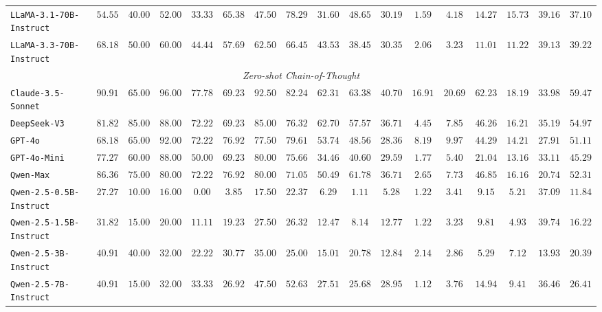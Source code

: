\begin{table*}[]
{\begin{tabular}{lcccccccccccccccc}
\texttt{LLaMA-3.1-70B-Instruct} & $54.55$ & $40.00$ & $52.00$ & $33.33$ & $65.38$ & $47.50$ & $78.29$ & $31.60$ & $48.65$ & $30.19$ & $1.59$ & $4.18$ & $14.27$ & $15.73$ & $39.16$ & $37.10$ \\
\texttt{LLaMA-3.3-70B-Instruct} & $68.18$ & $50.00$ & $60.00$ & $44.44$ & $57.69$ & $62.50$ & $66.45$ & $43.53$ & $38.45$ & $30.35$ & $2.06$ & $3.23$ & $11.01$ & $11.22$ & $39.13$ & $39.22$ \\
\midrule
\multicolumn{17}{c}{\textit{Zero-shot Chain-of-Thought}}                                                                        \\ \midrule
\texttt{Claude-3.5-Sonnet} & $90.91$ & $65.00$ & $96.00$ & $77.78$ & $69.23$ & $92.50$ & $82.24$ & $62.31$ & $63.38$ & $40.70$ & $16.91$ & $20.69$ & $62.23$ & $18.19$ & $33.98$ & $59.47$ \\
\texttt{DeepSeek-V3} & $81.82$ & $85.00$ & $88.00$ & $72.22$ & $69.23$ & $85.00$ & $76.32$ & $62.70$ & $57.57$ & $36.71$ & $4.45$ & $7.85$ & $46.26$ & $16.21$ & $35.19$ & $54.97$ \\
\texttt{GPT-4o} & $68.18$ & $65.00$ & $92.00$ & $72.22$ & $76.92$ & $77.50$ & $79.61$ & $53.74$ & $48.56$ & $28.36$ & $8.19$ & $9.97$ & $44.29$ & $14.21$ & $27.91$ & $51.11$ \\
\texttt{GPT-4o-Mini} & $77.27$ & $60.00$ & $88.00$ & $50.00$ & $69.23$ & $80.00$ & $75.66$ & $34.46$ & $40.60$ & $29.59$ & $1.77$ & $5.40$ & $21.04$ & $13.16$ & $33.11$ & $45.29$ \\
\texttt{Qwen-Max} & $86.36$ & $75.00$ & $80.00$ & $72.22$ & $76.92$ & $80.00$ & $71.05$ & $50.49$ & $61.78$ & $36.71$ & $2.65$ & $7.73$ & $46.85$ & $16.16$ & $20.74$ & $52.31$ \\
\texttt{Qwen-2.5-0.5B-Instruct} & $27.27$ & $10.00$ & $16.00$ & $0.00$ & $3.85$ & $17.50$ & $22.37$ & $6.29$ & $1.11$ & $5.28$ & $1.22$ & $3.41$ & $9.15$ & $5.21$ & $37.09$ & $11.84$ \\
\texttt{Qwen-2.5-1.5B-Instruct} & $31.82$ & $15.00$ & $20.00$ & $11.11$ & $19.23$ & $27.50$ & $26.32$ & $12.47$ & $8.14$ & $12.77$ & $1.22$ & $3.23$ & $9.81$ & $4.93$ & $39.74$ & $16.22$ \\
\texttt{Qwen-2.5-3B-Instruct} & $40.91$ & $40.00$ & $32.00$ & $22.22$ & $30.77$ & $35.00$ & $25.00$ & $15.01$ & $20.78$ & $12.84$ & $2.14$ & $2.86$ & $5.29$ & $7.12$ & $13.93$ & $20.39$ \\
\texttt{Qwen-2.5-7B-Instruct} & $40.91$ & $15.00$ & $32.00$ & $33.33$ & $26.92$ & $47.50$ & $52.63$ & $27.51$ & $25.68$ & $28.95$ & $1.12$ & $3.76$ & $14.94$ & $9.41$ & $36.46$ & $26.41$ \\

\end{tabular}}
\end{table*}
